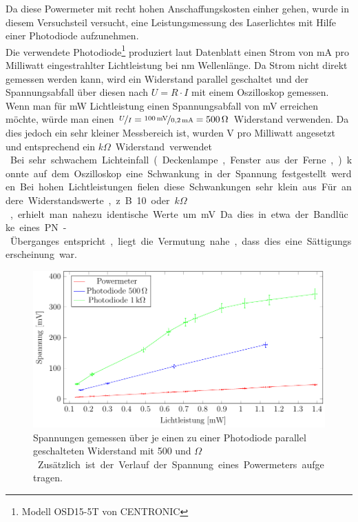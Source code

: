 
Da diese Powermeter mit recht hohen Anschaffungskosten einher gehen, wurde in diesem Versuchsteil versucht, eine Leistungsmessung des Laserlichtes mit Hilfe einer Photodiode aufzunehmen.\\

Die verwendete Photodiode\footnote{Modell OSD15-5T von CENTRONIC\cite{farnell.com_osd15-5t_????}} produziert laut Datenblatt einen Strom von \unit[0,18-0,21]{mA} pro Milliwatt eingestrahlter Lichtleistung bei \unit[436]{nm} Wellenlänge. Da Strom nicht direkt gemessen werden kann, wird ein Widerstand parallel geschaltet und der Spannungsabfall über diesen nach $U=R\cdot I$ mit einem Oszilloskop gemessen. Wenn man für \unit[1]{mW} Lichtleistung einen Spannungsabfall von \unit[100]{mV} erreichen möchte, würde man einen $\nicefrac{U}{I}=\nicefrac{\unit[100]{mV}}{\unit[0,2]{mA}}=\unit[500]{\Omega}$ Widerstand verwenden. Da dies jedoch ein sehr kleiner Messbereich ist, wurden \unit[4]{V} pro Milliwatt angesetzt und entsprechend ein \unit[20]{$k\Omega$} Widerstand verwendet.\\

Bei sehr schwachem Lichteinfall (Deckenlampe, Fenster aus der Ferne, ...) konnte auf dem Oszilloskop eine Schwankung in der Spannung festgestellt werden. Bei hohen Lichtleistungen fielen diese Schwankungen sehr klein aus. Für andere Widerstandswerte, z.B. 10 oder \unit[100]{$k\Omega$}, erhielt man nahezu identische Werte um \unit[440]{mV}. Da dies in etwa der Bandlücke eines PN-Überganges entspricht, liegt die Vermutung nahe, dass dies eine Sättigungserscheinung war.

\begin{figure}[ht]
	\centering
	\includegraphics[width=1\linewidth]{graphs/fotodiode/diode.pdf}
	\caption[Vermessung einer Photodiode]{
		Spannungen gemessen über je einen zu einer Photodiode parallel geschalteten Widerstand mit 500 und \unit[1000]{$\Omega$}. Zusätzlich ist der Verlauf der Spannung eines Powermeters aufgetragen.
	}
	\label{fig:photodiode}
\end{figure}

